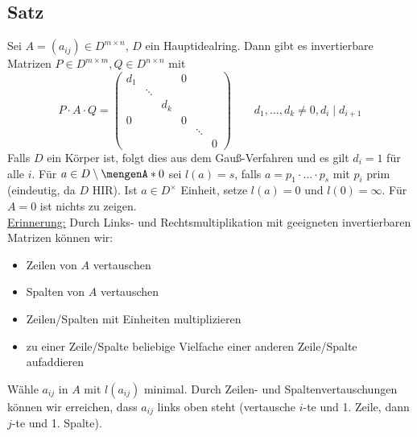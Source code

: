 \subsection[Satz: (Smith-Normalform) Invariante Faktoren einer Matrix über einem Hauptidealring]{Satz} %
\label{sub:243}
Sei $A= (a_{ij}) \in D^{m \times n}$, $D$ ein Hauptidealring. Dann gibt es invertierbare Matrizen $P  \in D^{m \times m}, Q \in D^{n \times n}$ mit 
\[
	P \cdot A \cdot Q = \begin{pmatrix}
		d_1 & & & 0 & & \\
		& \ddots & & & & \\
		& & d_k & & & \\
		0 & & & 0 & & \\
		& & & & \ddots & \\
		& & & & & 0
	\end{pmatrix}
	\qquad d_1, \ldots , d_k \not= 0, d_i \mid d_{i+1}
\]
Falls $D$ ein Körper ist, folgt dies aus dem Gauß-Verfahren und es gilt $d_i =1$ für alle $i$.
Für $a \in D \setminus \set{0}$ sei $l(a)=s$, falls $a= p_1 \cdot \ldots \cdot p_s$ mit $p_i$ prim (eindeutig, da $D$ HIR). Ist $a \in D^\times$ Einheit, setze $l(a)=0$
und $l(0)= \infty$. Für $A=0$ ist nichts zu zeigen. \\
\uline{Erinnerung:} Durch Links- und Rechtsmultiplikation mit geeigneten invertierbaren Matrizen können wir:
\begin{itemize}
	\item Zeilen von $A$ vertauschen
	\item Spalten von $A$ vertauschen
	\item Zeilen/Spalten mit Einheiten multiplizieren
	\item zu einer Zeile/Spalte beliebige Vielfache einer anderen Zeile/Spalte aufaddieren 
\end{itemize}
Wähle $a_{ij} $ in $A$ mit $l(a_{ij})$ minimal. Durch Zeilen- und Spaltenvertauschungen können wir erreichen, dass $a_{ij}$ links oben steht (vertausche $i$-te und 1.
Zeile, dann $j$-te und 1. Spalte). 

